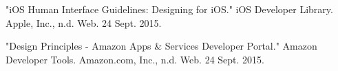 \documentclass[journal, a4paper]{IEEEtran}
\begin{document}
\begin{thebibliography}{5}

	"iOS Human Interface Guidelines: Designing for iOS." iOS Developer Library. Apple, Inc., n.d. Web. 24 Sept. 2015.

	"Design Principles - Amazon Apps \& Services Developer Portal." Amazon Developer Tools. Amazon.com, Inc., n.d. Web. 24 Sept. 2015.


\end{thebibliography}

\end{document}
